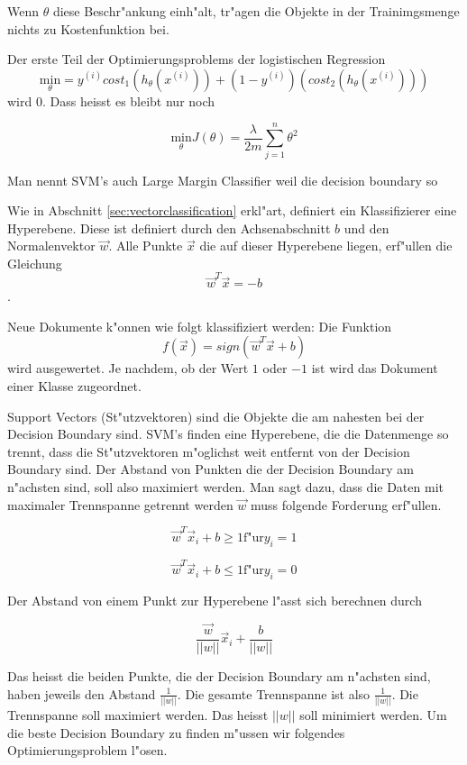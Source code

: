 \documentclass[12pt,a4paper,twoside]{article}
\begin{document}
Wenn $\theta$ diese Beschr"ankung einh"alt, tr"agen die Objekte in der Trainimgsmenge nichts zu Kostenfunktion bei.

Der erste Teil der Optimierungsproblems der logistischen Regression
\begin{equation}
  \label{eq:costsvm}
\underset{\theta}{\text{min}}   = y^{(i)} cost_1(h_{\theta}(x^{(i)})) + (1 - y^{(i)})(cost_2(h_{\theta}(x^{(i)}))) 
\end{equation}
wird 0. Dass heisst es bleibt nur noch

\begin{equation}
  \label{eq:opt}
  \underset{\theta}{\text{min}}  J(\theta) = \frac{\lambda}{2m} \sum_{j=1}^n \theta^2
\end{equation}

Man nennt SVM's auch Large Margin Classifier weil die decision boundary so

Wie in Abschnitt \ref{sec:vectorclassification} erkl"art, definiert ein Klassifizierer eine Hyperebene. Diese ist definiert durch den Achsenabschnitt $b$ und den Normalenvektor $ \vec w $. Alle Punkte $\vec x $ die auf dieser Hyperebene liegen, erf"ullen die Gleichung 
\[
\vec w^T \vec x = -b
\].

Neue Dokumente k"onnen wie folgt klassifiziert werden: Die Funktion
\[
f(\vec x ) = sign( \vec w^T \vec x + b)
\]
wird ausgewertet. Je nachdem, ob der Wert $1$ oder $-1$ ist wird das Dokument einer Klasse zugeordnet.

Support Vectors (St"utzvektoren) sind die Objekte die am nahesten bei der Decision Boundary sind. SVM's finden eine Hyperebene, die die Datenmenge so trennt, dass die St"utzvektoren m"oglichst weit entfernt von der Decision Boundary sind. Der Abstand von Punkten die der Decision Boundary am n"achsten sind, soll also  maximiert werden. Man sagt dazu, dass die Daten mit maximaler Trennspanne getrennt werden $\vec w$ muss folgende Forderung erf"ullen.

\[
\vec w^T \vec x_i + b \geq 1 \text{f"ur} y_i = 1
\]

\[
\vec w^T \vec x_i + b \leq 1 \text{f"ur} y_i = 0
\]

Der Abstand von einem Punkt zur Hyperebene l"asst sich berechnen durch

\[
\frac{\vec w}{||w||} \vec x_i + \frac{b}{||w||}
\]

Das heisst die beiden Punkte, die der Decision Boundary am n"achsten sind, haben jeweils den Abstand $\frac{1}{||w||}$. Die gesamte Trennspanne ist also $\frac{1}{||w||}$. Die Trennspanne soll maximiert werden. Das heisst $||w||$ soll minimiert werden. Um die beste Decision Boundary zu finden m"ussen wir folgendes Optimierungsproblem l"osen.
\end{document}

